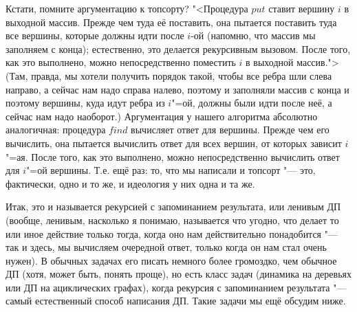 Кстати, помните аргументацию к топсорту? "<Процедура $put$ ставит вершину $i$ в выходной массив. Прежде чем туда её поставить, она пытается поставить туда все вершины, которые должны идти после $i$-ой (напомню, что массив мы заполняем с конца); естественно, это делается рекурсивным вызовом. После того, как это выполнено, 
можно непосредственно поместить $i$ в выходной массив."> (Там, правда, мы хотели получить порядок такой, чтобы все ребра шли слева направо, а сейчас нам надо справа налево, поэтому и заполняли массив с конца и поэтому вершины, куда идут ребра из $i$"=ой, должны были идти после неё, а сейчас нам надо наоборот.) Аргументация у нашего алгоритма абсолютно аналогичная: процедура $find$ вычисляет ответ для вершины. Прежде чем его вычислить, она пытается вычислить ответ для всех вершин, от которых зависит $i$"=ая. После того, как это выполнено, можно непосредственно вычислить ответ для $i$"=ой вершины. Т.е. ещё раз: то, что мы написали и топсорт "--- это, фактически, одно и то же, и идеология у них одна и та же.

Итак, это и называется рекурсией с запоминанием результата, или ленивым ДП (вообще, ленивым, насколько я понимаю, называется что угодно, что делает то или иное действие только тогда, когда оно нам действительно понадобится "--- так и здесь, мы вычисляем очередной ответ, только когда он нам стал очень нужен). В обычных задачах его писать немного более громоздко, чем обычное ДП (хотя, может быть, понять проще), но есть класс задач (динамика на деревьях или ДП на ациклических графах), когда рекурсия с запоминанием результата "--- самый естественный способ написания ДП. Такие задачи мы ещё обсудим ниже.

